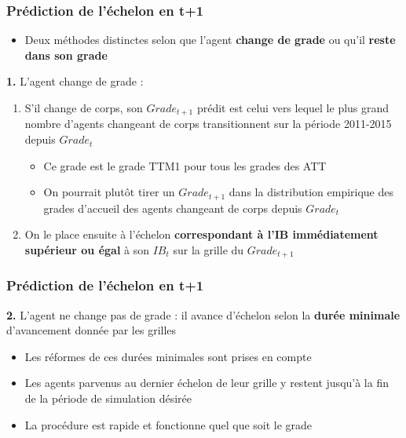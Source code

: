 \documentclass[xcolor=table,ignorenonframetext,12pt]{beamer}
\begin{document}
\begin{frame}
\frametitle{Prédiction de l'échelon en t+1}
\begin{itemize}
\item Deux méthodes distinctes selon que l'agent \textbf{change de grade} ou qu'il \textbf{reste dans son grade}
\end{itemize}

	\textbf{1.} L'agent change de grade : \\
	\begin{enumerate}
	\item S'il change de corps, son $Grade_{t+1}$ prédit est celui vers lequel le plus grand nombre d'agents changeant de corps transitionnent sur la période 2011-2015 depuis $Grade_{t}$\\
	\begin{footnotesize}
		\begin{itemize}
		\item Ce grade est le grade TTM1 pour tous les grades des ATT 
		\item On pourrait plutôt tirer un $Grade_{t+1}$ dans la distribution empirique des grades d'accueil des agents changeant de corps depuis $Grade_{t}$
	\end{itemize}
	\end{footnotesize}
	\item On le place ensuite à l'échelon \textbf{correspondant à l'IB immédiatement supérieur ou égal} à son $IB_t$ sur la grille du $Grade_{t+1}$ 
	\end{enumerate}
	
	

\end{frame}

\begin{frame}
\frametitle{Prédiction de l'échelon en t+1}


	\textbf{2.}  L'agent ne change pas de grade : il avance d'échelon selon la \textbf{durée minimale} d'avancement donnée par les grilles\\
	\begin{itemize}
		\item Les réformes de ces durées minimales sont prises en compte
\begin{itemize}
\end{itemize}
		\item Les agents parvenus au dernier échelon de leur grille y restent jusqu'à la fin de la période de simulation désirée
		\item La procédure est rapide et fonctionne quel que soit le grade
	\end{itemize}

	

\end{frame}
\end{document}
